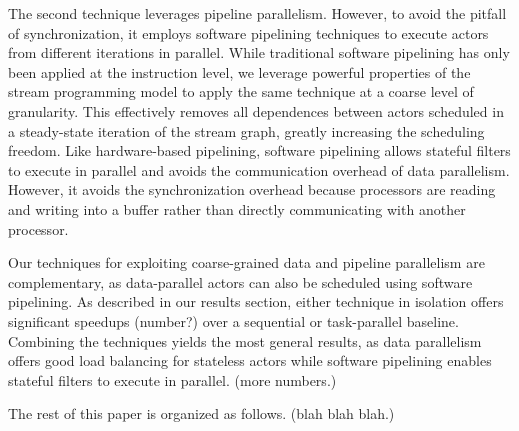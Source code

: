 The second technique leverages pipeline parallelism.  However, to
avoid the pitfall of synchronization, it employs software pipelining
techniques to execute actors from different iterations in parallel.
While traditional software pipelining has only been applied at the
instruction level, we leverage powerful properties of the stream
programming model to apply the same technique at a coarse level of
granularity.  This effectively removes all dependences between actors
scheduled in a steady-state iteration of the stream graph, greatly
increasing the scheduling freedom.  Like hardware-based pipelining,
software pipelining allows stateful filters to execute in parallel and
avoids the communication overhead of data parallelism.  However, it
avoids the synchronization overhead because processors are reading and
writing into a buffer rather than directly communicating with another
processor.

Our techniques for exploiting coarse-grained data and pipeline
parallelism are complementary, as data-parallel actors can also be
scheduled using software pipelining.  As described in our results
section, either technique in isolation offers significant speedups
(number?) over a sequential or task-parallel baseline.  Combining the
techniques yields the most general results, as data parallelism offers
good load balancing for stateless actors while software pipelining
enables stateful filters to execute in parallel.  (more numbers.)

The rest of this paper is organized as follows.  (blah blah blah.)

